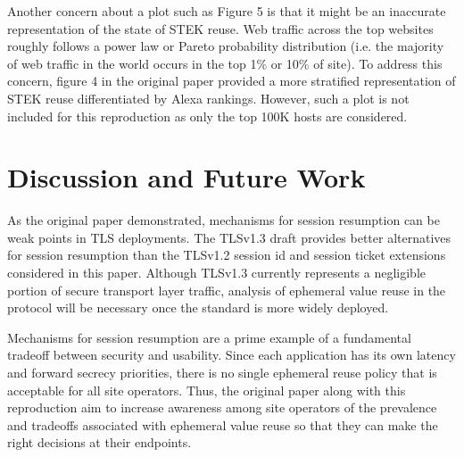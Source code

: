 Another concern about a plot such as Figure 5 is that it might be an inaccurate representation of the state of STEK reuse. Web traffic across the top websites roughly follows a power law or Pareto probability distribution (i.e. the majority of web traffic in the world occurs in the top 1\% or 10\% of site). To address this concern, figure 4 in the original paper provided a more stratified representation of STEK reuse differentiated by Alexa rankings. However, such a plot is not included for this reproduction as only the top 100K hosts are considered.

\section{Discussion and Future Work}
As the original paper demonstrated, mechanisms for session resumption can be weak points in TLS deployments. The TLSv1.3 draft provides better alternatives for session resumption than the TLSv1.2 session id and session ticket extensions considered in this paper. Although TLSv1.3 currently represents a negligible portion of secure transport layer traffic, analysis of ephemeral value reuse in the protocol will be necessary once the standard is more widely deployed.

Mechanisms for session resumption are a prime example of a fundamental tradeoff between security and usability. Since each application has its own latency and forward secrecy priorities, there is no single ephemeral reuse policy that is acceptable for all site operators. Thus, the original paper along with this reproduction aim to increase awareness among site operators of the prevalence and tradeoffs associated with ephemeral value reuse so that they can make the right decisions at their endpoints.
